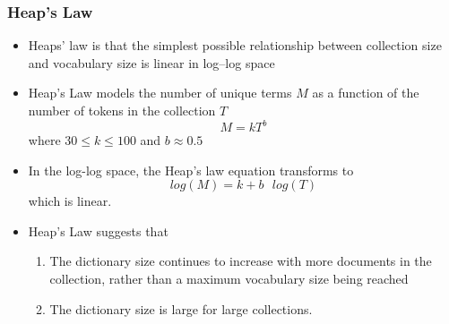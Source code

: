 \documentclass{article}
\begin{document}
\subsubsection{Heap's Law}
\begin{itemize}

    \item Heaps’ law is that the simplest possible relationship between collection size and vocabulary size is linear in log–log space
    
    \item Heap's Law models the number of unique terms $M$ as a function of the number of tokens in the collection $T$
    \begin{equation}
        M = k T^b
    \end{equation}
    where $30 \le k \le 100$ and $b \approx 0.5$
    
    \item In the log-log space, the Heap's law equation transforms to
    \begin{equation}
        log(M) = k + b\text{ }log(T)
    \end{equation}
    which is linear. 
    
    \item Heap's Law suggests that 
    \begin{enumerate}
    \item The dictionary size continues to increase with more documents in the collection, rather than a maximum vocabulary size being reached

    \item The dictionary size is large for large collections.
    \end{enumerate}
\end{itemize}
\end{document}
